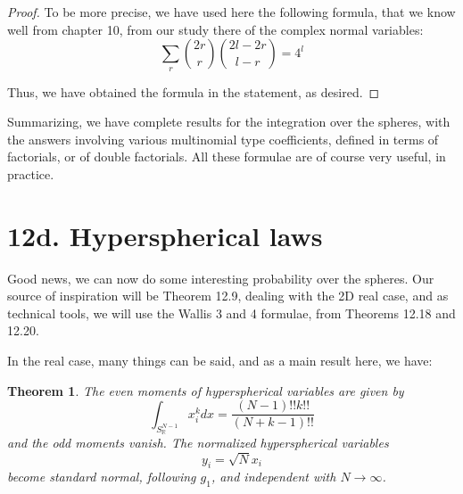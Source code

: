 \documentclass[12pt]{amsbook}
\newtheorem{theorem}{Theorem}[chapter]
\begin{document}
\begin{proof}
To be more precise, we have used here the following formula, that we know well from chapter 10, from our study there of the complex normal variables:
$$\sum_r\binom{2r}{r}\binom{2l-2r}{l-r}=4^l$$

Thus, we have obtained the formula in the statement, as desired.
\end{proof}

Summarizing, we have complete results for the integration over the spheres, with the answers involving various multinomial type coefficients, defined in terms of factorials, or of double factorials. All these formulae are of course very useful, in practice.

\section*{12d. Hyperspherical laws}

Good news, we can now do some interesting probability over the spheres. Our source of inspiration will be Theorem 12.9, dealing with the 2D real case, and as technical tools, we will use the Wallis 3 and 4 formulae, from Theorems 12.18 and 12.20.

\bigskip

In the real case, many things can be said, and as a main result here, we have:


\begin{theorem}
The even moments of hyperspherical variables are given by
$$\int_{S^{N-1}_\mathbb R}x_i^kdx=\frac{(N-1)!!k!!}{(N+k-1)!!}$$
and the odd moments vanish. The normalized hyperspherical variables 
$$y_i=\sqrt{N}x_i$$
become standard normal, following $g_1$, and independent with $N\to\infty$.
\end{theorem}
\end{document}
